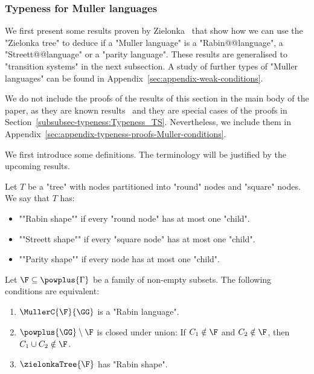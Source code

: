 \documentclass{theoretics}
\begin{document}
\subsubsection{Typeness for Muller languages}\label{subsubsec-typeness:Typeness_Conditions}

We first present some results proven by Zielonka~\cite[Section~5]{Zielonka1998infinite} that show how we can use the "Zielonka tree" to deduce if a "Muller language" is a "Rabin@@language", a "Streett@@language" or a "parity language". These results are generalised to "transition systems" in the next subsection. A study of further types of "Muller languages" can be found in Appendix~\ref{sec:appendix-weak-conditions}.

We do not include the proofs of the results of this section in the main body of the paper, as they are known results~\cite[Section~5]{Zielonka1998infinite} and they are special cases of the proofs in Section~\ref{subsubsec-typeness:Typeness_TS}. Nevertheless, we include them in Appendix~\ref{sec:appendix-typeness-proofs-Muller-conditions}.

We first introduce some definitions. The terminology will be justified by the upcoming results.

\begin{definition}\label{def:ShapesOfTrees}
	Let $T$ be a "tree" with nodes partitioned into "round" nodes and "square" nodes. We say that $T$ has:
	\begin{itemize}
		\item  \AP""Rabin shape"" if every "round node" has at most one "child".
		
		\item  \AP""Streett shape"" if every "square node" has at most one "child".
		
		\item  \AP""Parity shape"" if every node has at most one "child".
	\end{itemize}
\end{definition}


\begin{proposition}\label{prop-typ:RabinZielonkaShape}
	Let $\F\subseteq \powplus{\Gamma}$ be a family of non-empty subsets. The following conditions are equivalent:
	\begin{enumerate}
		\item $\MullerC{\F}{\GG}$ is a "Rabin language".
		\item $\powplus{\GG}\setminus \F$ is closed under union: If %
		$C_1\notin \F$ and $C_2\notin \F$, then $C_1\cup C_2\notin\F$.
		\item $\zielonkaTree{\F}$ has "Rabin shape". 
	\end{enumerate}
\end{proposition}
\end{document}
